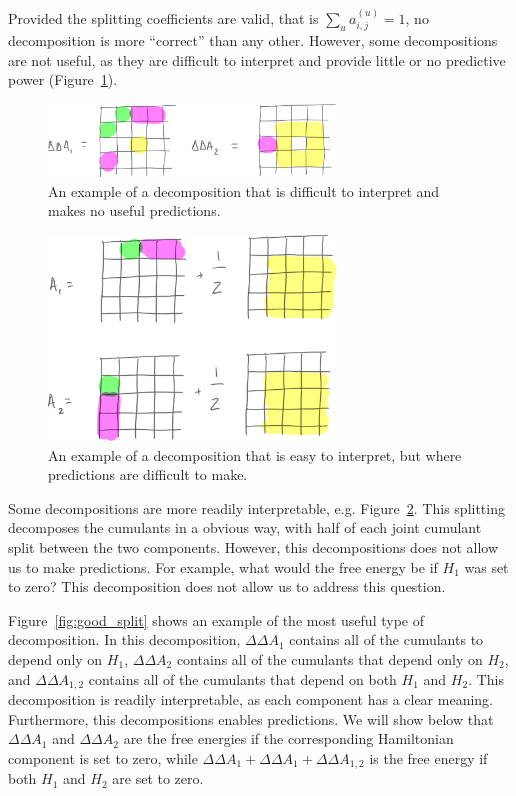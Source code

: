 \documentclass{article}
\begin{document}
Provided the splitting coefficients are valid, that is $\sum_u a_{i,j}^{(u)}=1$, no decomposition is more ``correct'' than any other. However, some decompositions are not useful, as they are difficult to interpret and provide little or no predictive power (Figure~\ref{fig:bad_split}).

\begin{figure}[tb]
\centering
\includegraphics[width=3in]{figure6.pdf}
\caption{An example of a decomposition that is difficult to interpret and makes no useful predictions.}
\label{fig:bad_split}
\end{figure}

\begin{figure}[tb]
\centering
\includegraphics[width=3in]{figure4.pdf}
\caption{An example of a decomposition that is easy to interpret, but where predictions are difficult to make.}
\label{fig:ok_split}
\end{figure}

Some decompositions are more readily interpretable, e.g. Figure~\ref{fig:ok_split}. This splitting decomposes the cumulants in a obvious way, with half of each joint cumulant split between the two components. However, this decompositions does not allow us to make predictions. For example, what would the free energy be if $H_1$ was set to zero? This decomposition does not allow us to address this question.


Figure~\ref{fig:good_split} shows an example of the most useful type of decomposition. In this decomposition, $\Delta\Delta A_1$ contains all of the cumulants to depend only on $H_1$, $\Delta\Delta A_2$ contains all of the cumulants that depend only on $H_2$, and $\Delta\Delta A_{1,2}$ contains all of the cumulants that depend on both $H_1$ and $H_2$. This decomposition is readily interpretable, as each component has a clear meaning. Furthermore, this decompositions enables predictions. We will show below that $\Delta\Delta A_1$ and $\Delta\Delta A_2$ are the free energies if the corresponding Hamiltonian component is set to zero, while $\Delta\Delta A_1 + \Delta\Delta A_1 + \Delta\Delta A_{1,2}$ is the free energy if both $H_1$ and $H_2$ are set to zero.
\end{document}
